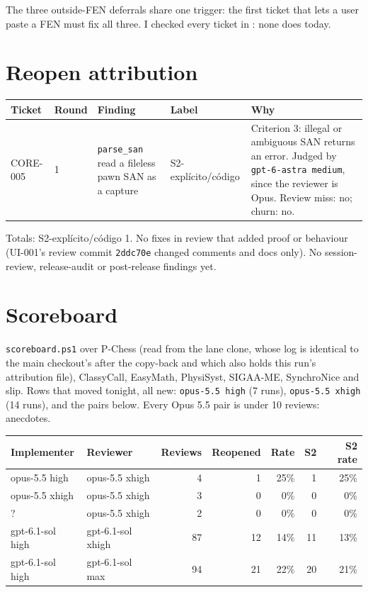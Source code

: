 \documentclass[11pt,a4paper]{article}
\begin{document}
The three outside-FEN deferrals share one trigger: the first ticket that lets a user paste a
FEN must fix all three. I checked every ticket in : none does today.

\section*{Reopen attribution}

\begin{tabularx}{\linewidth}{@{}llXlX@{}}
\toprule
Ticket & Round & Finding & Label & Why \\
\midrule
CORE-005 & 1 & \texttt{parse\_san} read a fileless pawn SAN as a capture & S2-explícito/código & Criterion 3: illegal or ambiguous SAN returns an error. Judged by \texttt{gpt-6-astra medium}, since the reviewer is Opus. Review miss: no; churn: no. \\
\bottomrule
\end{tabularx}

\medskip
Totals: S2-explícito/código 1. No fixes in review that added proof or behaviour (UI-001's
review commit \texttt{2ddc70e} changed comments and docs only). No session-review,
release-audit or post-release findings yet.

\section*{Scoreboard}

\texttt{scoreboard.ps1} over P-Chess (read from the lane clone, whose log is identical to the
main checkout's after the copy-back and which also holds this run's attribution file),
ClassyCall, EasyMath, PhysiSyst, SIGAA-ME, SynchroNice and slip. Rows that moved tonight,
all new: \texttt{opus-5.5 high} (7 runs), \texttt{opus-5.5 xhigh} (14 runs), and the pairs
below. Every Opus 5.5 pair is under 10 reviews: anecdotes.

{\small
\begin{tabular}{@{}llrrrrr@{}}
\toprule
Implementer & Reviewer & Reviews & Reopened & Rate & S2 & S2 rate \\
\midrule
opus-5.5 high & opus-5.5 xhigh & 4 & 1 & 25\% & 1 & 25\% \\
opus-5.5 xhigh & opus-5.5 xhigh & 3 & 0 & 0\% & 0 & 0\% \\
? & opus-5.5 xhigh & 2 & 0 & 0\% & 0 & 0\% \\
\midrule
gpt-6.1-sol high & gpt-6.1-sol xhigh & 87 & 12 & 14\% & 11 & 13\% \\
gpt-6.1-sol high & gpt-6.1-sol max & 94 & 21 & 22\% & 20 & 21\% \\
\bottomrule
\end{tabular}
}
\end{document}
